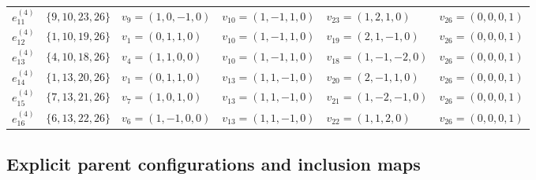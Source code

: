 \documentclass[aps,pra,reprint,superscriptaddress,longbibliography,nofootinbib,floatfix,10pt]{revtex4-2}
\theoremstyle{definition}
\begin{document}
\begin{longtable}{llllll}
$e_{11}^{(4)}$ & $\{9,10,23,26\}$ & $v_9=(1,0,-1,0)$ & $v_{10}=(1,-1,1,0)$ & $v_{23}=(1,2,1,0)$  & $v_{26}=(0,0,0,1)$ \\*
$e_{12}^{(4)}$ & $\{1,10,19,26\}$ & $v_1=(0,1,1,0)$  & $v_{10}=(1,-1,1,0)$ & $v_{19}=(2,1,-1,0)$ & $v_{26}=(0,0,0,1)$ \\*
$e_{13}^{(4)}$ & $\{4,10,18,26\}$ & $v_4=(1,1,0,0)$  & $v_{10}=(1,-1,1,0)$ & $v_{18}=(1,-1,-2,0)$& $v_{26}=(0,0,0,1)$ \\*
$e_{14}^{(4)}$ & $\{1,13,20,26\}$ & $v_1=(0,1,1,0)$  & $v_{13}=(1,1,-1,0)$ & $v_{20}=(2,-1,1,0)$ & $v_{26}=(0,0,0,1)$ \\*
$e_{15}^{(4)}$ & $\{7,13,21,26\}$ & $v_7=(1,0,1,0)$  & $v_{13}=(1,1,-1,0)$ & $v_{21}=(1,-2,-1,0)$& $v_{26}=(0,0,0,1)$ \\*
$e_{16}^{(4)}$ & $\{6,13,22,26\}$ & $v_6=(1,-1,0,0)$ & $v_{13}=(1,1,-1,0)$ & $v_{22}=(1,1,2,0)$  & $v_{26}=(0,0,0,1)$
\end{longtable}
\endgroup

\FloatBarrier
\subsection{Explicit parent configurations and inclusion maps}
\label{app:parents-vectors}
\end{document}
